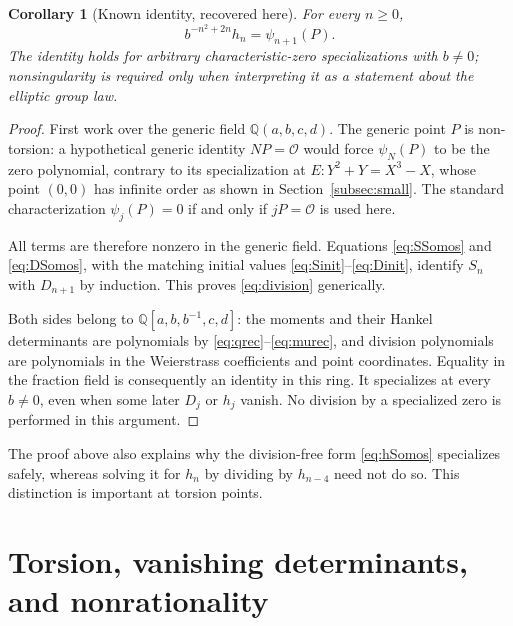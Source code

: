 \documentclass[11pt,letterpaper]{article}
\numberwithin{equation}{section}
\newtheorem{corollary}[theorem]{Corollary}
\theoremstyle{definition}
\theoremstyle{remark}
\newcommand{\Q}{\mathbb{Q}}
\newcommand{\OO}{\mathcal{O}}
\begin{document}
\begin{corollary}[Known identity, recovered here]\label{cor:division}
For every $n\ge0$,
\begin{equation}\label{eq:division}
 \boxed{\qquad b^{-n^2+2n}h_n=\psi_{n+1}(P).\qquad}
\end{equation}
The identity holds for arbitrary characteristic-zero specializations with
$b\ne0$; nonsingularity is required only when interpreting it as a
statement about the elliptic group law.
\end{corollary}
\begin{proof}
First work over the generic field $\Q(a,b,c,d)$. The generic point $P$
is non-torsion: a hypothetical generic identity $NP=\OO$ would force
$\psi_N(P)$ to be the zero polynomial, contrary to its specialization at
$E:Y^2+Y=X^3-X$, whose point $(0,0)$ has infinite order as shown in
Section~\ref{subsec:small}. The standard characterization
$\psi_j(P)=0$ if and only if $jP=\OO$ is used here.

All terms are therefore nonzero in the generic field. Equations
\eqref{eq:SSomos} and \eqref{eq:DSomos}, with the matching initial
values \eqref{eq:Sinit}--\eqref{eq:Dinit}, identify $S_n$ with $D_{n+1}$
by induction. This proves \eqref{eq:division} generically.

Both sides belong to $\Q[a,b,b^{-1},c,d]$: the moments and their
Hankel determinants are polynomials by \eqref{eq:qrec}--\eqref{eq:murec},
and division polynomials are polynomials in the Weierstrass coefficients
and point coordinates. Equality in the fraction field is consequently
an identity in this ring. It specializes at every $b\ne0$, even when
some later $D_j$ or $h_j$ vanish. No division by a specialized zero is
performed in this argument.
\end{proof}

The proof above also explains why the division-free form
\eqref{eq:hSomos} specializes safely, whereas solving it for $h_n$ by
dividing by $h_{n-4}$ need not do so. This distinction is important at
torsion points.

\section{Torsion, vanishing determinants, and nonrationality}\label{sec:torsion}
\end{document}
